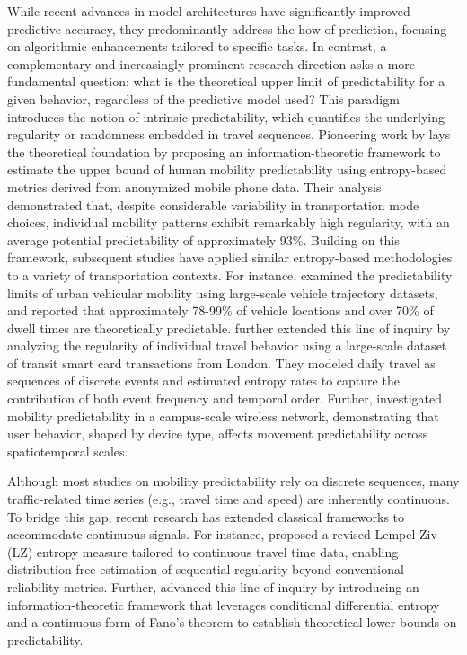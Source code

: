 \documentclass[12pt,review,authoryear]{elsarticle}
\theoremstyle{upright}
\begin{document}
While recent advances in model architectures have significantly improved predictive accuracy, they predominantly address the how of prediction, focusing on algorithmic enhancements tailored to specific tasks.  In contrast, a complementary and increasingly prominent research direction asks a more fundamental question: what is the theoretical upper limit of predictability for a given behavior, regardless of the predictive model used? This paradigm introduces the notion of intrinsic predictability, which quantifies the underlying regularity or randomness embedded in travel sequences. Pioneering work by \citet{song2010limits} lays the theoretical foundation by proposing an information-theoretic framework to estimate the upper bound of human mobility predictability using entropy-based metrics derived from anonymized mobile phone data. Their analysis demonstrated that, despite considerable variability in transportation mode choices, individual mobility patterns exhibit remarkably high regularity, with an average potential predictability of approximately 93\%.  Building on this framework, subsequent studies have applied similar entropy-based methodologies to a variety of transportation contexts. For instance, \citet{li2014limits} examined the predictability limits of urban vehicular mobility using large-scale vehicle trajectory datasets, and reported that approximately 78-99\% of vehicle locations and over 70\% of dwell times are theoretically predictable. \citet{goulet2017measuring} further extended this line of inquiry by analyzing the regularity of individual travel behavior using a large-scale dataset of transit smart card transactions from London. They modeled daily travel as sequences of discrete events and estimated entropy rates to capture the contribution of both event frequency and temporal order. Further, \citet{alipour2019you} investigated mobility predictability in a campus-scale wireless network, demonstrating that user behavior, shaped by device type, affects movement predictability across spatiotemporal scales.

Although most studies on mobility predictability rely on discrete sequences, many traffic-related time series (e.g., travel time and speed) are inherently continuous. To bridge this gap, recent research has extended classical frameworks to accommodate continuous signals. For instance, \citet{li2019travel} proposed a revised Lempel-Ziv (LZ) entropy measure tailored to continuous travel time data, enabling distribution-free estimation of sequential regularity beyond conventional reliability metrics. Further, \citet{li2022estimate} advanced this line of inquiry by introducing an information-theoretic framework that leverages conditional differential entropy and a continuous form of Fano’s theorem to establish theoretical lower bounds on predictability. %
\end{document}
